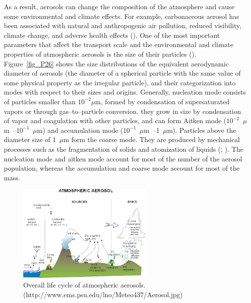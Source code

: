 \documentclass[12pt, fullpage]{uiucthesis2009}
\begin{document}
	As a result, aerosols can change the composition of the atmosphere and cause some environmental and climate effects. For example, carbonaceous aerosol has been associated with natural and anthropogenic air pollution, reduced visibility, climate change, and adverse health effects (\cite{Mauderly2008}). One of the most important parameters that affect the transport scale and the environmental and climate properties of atmospheric aerosols is the size of their particles (\cite{Pacyna1995}). Figure~\ref{fig_P26} shows the size distributions of the equivalent aerodynamic diameter of aerosols (the diameter of a spherical particle with the same value of some physical property as the irregular particle), and their categorization into modes with respect to their sizes and origins. Generally, nucleation mode consists of particles smaller than $10^{-2}\mu$m, formed by condensation of supersaturated vapors or through gas--to--particle conversion. they grow in size by condensation of vapor and coagulation with other particles, and can form Aitken mode ($10^{-2}$~$\mu$m~--$10^{-1}$~$\mu$m) and accumulation mode ($10^{-1}$~$\mu$m~--1~$\mu$m). Particles above the diameter size of 1~$\mu$m form the coarse mode. They are produced by mechanical processes such as the fragmentation of solids and atomization of liquids (\cite{Pacyna1995}; \cite{kulmala2004}).
	The nucleation mode and aitken mode account for most of the number of the aerosol population, whereas the accumulation and coarse mode account for most of the mass. 
	
	\begin{figure}[h] 
		\begin{center}
			\includegraphics[width = 0.6\textwidth]{Figure25}
			\caption[Overall life cycle of atmospheric aerosols]{\label{fig_P25} Overall life cycle of atmospheric aerosols. (http://www.ems.psu.edu/lno/Meteo437/Aerosol.jpg)}
		\end{center}
	\end{figure}
	
\end{document}
